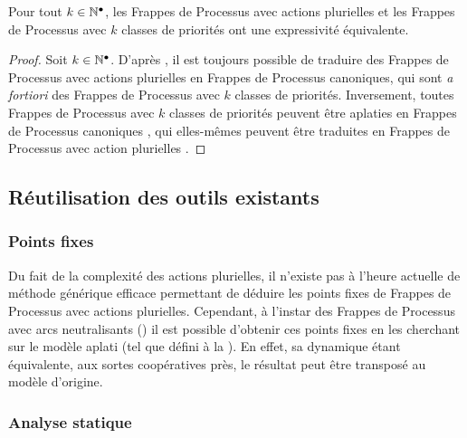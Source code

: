 \begin{theorem}[Équivalence]
  Pour tout $k \in \mathbb{N}^\bullet$,
  les Frappes de Processus avec actions plurielles
  et les Frappes de Processus avec $k$ classes de priorités
  ont une expressivité équivalente.
\end{theorem}

\begin{proof}
  Soit $k \in \mathbb{N}^\bullet$.
  D'après \storef, il est toujours possible de traduire des Frappes de Processus avec actions
  plurielles en Frappes de Processus canoniques, qui sont \textit{a fortiori}
  des Frappes de Processus avec $k$ classes de priorités.
  Inversement, toutes Frappes de Processus avec $k$ classes de priorités
  peuvent être aplaties en Frappes de Processus canoniques \storef,
  qui elles-mêmes peuvent être traduites en Frappes de Processus avec action plurielles \storef.
\end{proof}



\subsection{Réutilisation des outils existants}



\subsubsection{Points fixes}

Du fait de la complexité des actions plurielles, il n'existe pas à l'heure actuelle de méthode
générique efficace permettant de déduire les points fixes de Frappes de Processus avec
actions plurielles.
Cependant, à l'instar des Frappes de Processus avec arcs neutralisants
()
il est possible d'obtenir ces points fixes en les cherchant sur
le modèle aplati (tel que défini à la ).
En effet, sa dynamique étant équivalente, aux sortes coopératives près, le résultat
peut être transposé au modèle d'origine.

\subsubsection{Analyse statique}

